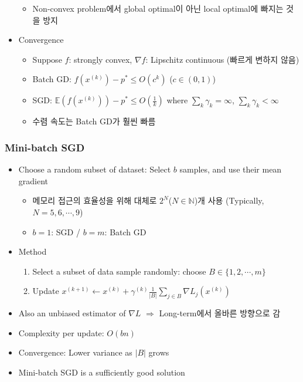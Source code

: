 \begin{itemize}
\begin{itemize}
        \item Non-convex problem에서 global optimal이 아닌 local optimal에 빠지는 것을 방지
    \end{itemize}
    \item Convergence
    \begin{itemize}
        \item Suppose $f$: strongly convex, $\nabla f$: Lipschitz continuous (빠르게 변하지 않음)
        \item Batch GD: $f(x^{(k)})-p^\ast\leq O\left(c^k\right)$ ($c\in(0,1)$)
        \item SGD: $\mathbb{E}(f(x^{(k)}))-p^\ast\leq O\left(\frac{1}{k}\right)$ where $\sum_k\gamma_k=\infty$, $\sum_k\gamma_k<\infty$
        \item 수렴 속도는 Batch GD가 훨씬 빠름
    \end{itemize}
\end{itemize}

\subsubsection*{Mini-batch SGD}
\begin{itemize}
    \item Choose a random subset of dataset: Select $b$ samples, and use their mean gradient
    \begin{itemize}
        \item 메모리 접근의 효율성을 위해 대체로 $2^N$($N\in\mathbb{N}$)개 사용 (Typically, $N=5,6,\cdots,9$)
        \item $b=1$: SGD / $b=m$: Batch GD
    \end{itemize}
    \item Method
    \begin{enumerate}
        \item Select a subset of data sample randomly: choose $B\in\{1,2,\cdots,m\}$
        \item Update $x^{(k+1)}\leftarrow x^{(k)}+\gamma^{(k)}\frac{1}{|B|}\sum_{j\in B}\nabla L_j(x^{(k)})$
    \end{enumerate}
    \item Also an unbiased estimator of $\nabla L$ $\Rightarrow$ Long-term에서 올바른 방향으로 감
    \item Complexity per update: $O(bn)$
    \item Convergence: Lower variance as $|B|$ grows
    \item Mini-batch SGD is a sufficiently good solution
\end{itemize}
\begin{figures}
\end{figures}
